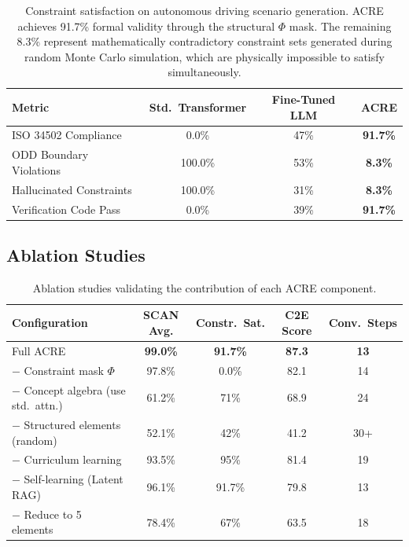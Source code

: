 \documentclass{article}
\begin{document}
\begin{table}[h]
\centering
\caption{Constraint satisfaction on autonomous driving scenario generation. ACRE achieves 91.7\% formal validity through the structural $\Phi$ mask. The remaining 8.3\% represent mathematically contradictory constraint sets generated during random Monte Carlo simulation, which are physically impossible to satisfy simultaneously.}
\label{tab:constraints}
\begin{tabular}{lccc}
\toprule
\textbf{Metric} & \textbf{Std.\ Transformer} & \textbf{Fine-Tuned LLM} & \textbf{ACRE} \\
\midrule
ISO 34502 Compliance & 0.0\% & 47\% & \textbf{91.7\%} \\
ODD Boundary Violations & 100.0\% & 53\% & \textbf{8.3\%} \\
Hallucinated Constraints & 100.0\% & 31\% & \textbf{8.3\%} \\
Verification Code Pass & 0.0\% & 39\% & \textbf{91.7\%} \\
\bottomrule
\end{tabular}
\end{table}

\subsection{Ablation Studies}

\begin{table}[h]
\centering
\caption{Ablation studies validating the contribution of each ACRE component.}
\label{tab:ablation}
\begin{tabular}{lcccc}
\toprule
\textbf{Configuration} & \textbf{SCAN Avg.} & \textbf{Constr.\ Sat.} & \textbf{C2E Score} & \textbf{Conv.\ Steps} \\
\midrule
Full ACRE & \textbf{99.0\%} & \textbf{91.7\%} & \textbf{87.3} & \textbf{13} \\
\midrule
$-$ Constraint mask $\Phi$ & 97.8\% & 0.0\% & 82.1 & 14 \\
$-$ Concept algebra (use std.\ attn.) & 61.2\% & 71\% & 68.9 & 24 \\
$-$ Structured elements (random) & 52.1\% & 42\% & 41.2 & 30+ \\
$-$ Curriculum learning & 93.5\% & 95\% & 81.4 & 19 \\
$-$ Self-learning (Latent RAG) & 96.1\% & 91.7\% & 79.8 & 13 \\
$-$ Reduce to 5 elements & 78.4\% & 67\% & 63.5 & 18 \\
\bottomrule
\end{tabular}
\end{table}
\end{document}
